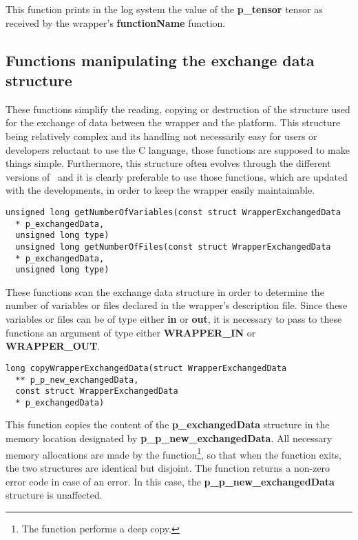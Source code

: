 This function prints in the log system the value of the {\bf p\_tensor} tensor as received by the wrapper's {\bf functionName} function.

\subsection{Functions manipulating the exchange data structure}

These functions simplify the reading, copying or destruction of the structure used for the exchange of data between the wrapper and the platform. This structure being relatively complex and its handling not necessarily easy for users or developers reluctant to use the C language, those functions are supposed to make things simple. Furthermore, this structure often evolves through the different versions of \OT\ and it is clearly preferable to use those functions, which are updated with the developments, in order to keep the wrapper easily maintainable.

\lstset{language=C++, basicstyle=\normalsize}
\begin{lstlisting}[frame=TRBL]
  unsigned long getNumberOfVariables(const struct WrapperExchangedData
  * p_exchangedData,
  unsigned long type)
  unsigned long getNumberOfFiles(const struct WrapperExchangedData
  * p_exchangedData,
  unsigned long type)
\end{lstlisting}

These functions scan the exchange data structure in order to determine the number of variables or files declared in the wrapper's description file. Since these variables or files can be of type either {\bf in} or {\bf out}, it is necessary to pass to these functions an argument of type either {\bf WRAPPER\_IN} or {\bf WRAPPER\_OUT}.

\lstset{language=C++, basicstyle=\normalsize}
\begin{lstlisting}[frame=TRBL]
  long copyWrapperExchangedData(struct WrapperExchangedData
  ** p_p_new_exchangedData,
  const struct WrapperExchangedData
  * p_exchangedData)
\end{lstlisting}

This function copies the content of the {\bf p\_exchangedData} structure in the memory location designated by {\bf p\_p\_new\_exchangedData}. All necessary memory allocations are made by the function\footnote{The function performs a deep copy.}, so that when the function exits, the two structures are identical but disjoint. The function returns a non-zero error code in case of an error. In this case, the {\bf p\_p\_new\_exchangedData} structure is unaffected.

